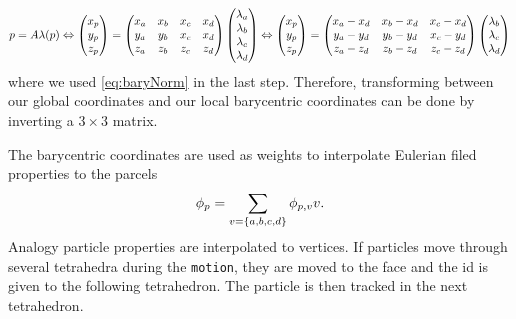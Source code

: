 \begin{equation}
    p = A \lambda (p) \Leftrightarrow \begin{pmatrix}
        x_p \\ y_p \\ z_p
    \end{pmatrix} =
    \begin{pmatrix}
        x_{a} & x_{b} & x_{c} & x_{d} \\
        y_{a} & y_{b} & x_{c} & x_{d} \\
        z_{a} & z_{b} & z_{c} & z_{d}
    \end{pmatrix}
    \begin{pmatrix}
        \lambda_a \\ \lambda_b \\ \lambda_c \\ \lambda_d
    \end{pmatrix}
    \Leftrightarrow
    \begin{pmatrix}
        x_p \\ y_p \\ z_p
    \end{pmatrix} =
    \begin{pmatrix}
        x_{a} - x_{d} & x_{b}- x_{d} & x_{c}- x_{d} \\
        y_{a}- y_{d} & y_{b} - y_{d}& x_{c}- y_{d} \\
        z_{a} - z_{d} & z_{b} - z_{d} & z_{c} - z_{d}
    \end{pmatrix} \begin{pmatrix}
         \lambda_b \\ \lambda_c \\ \lambda_d
    \end{pmatrix}
\end{equation}
where we used \eqref{eq:baryNorm} in the last step.
Therefore, transforming between our global coordinates and our local barycentric coordinates can be done by inverting a $3 \times 3$ matrix.


The barycentric coordinates are used as weights to interpolate Eulerian filed properties to the parcels
\begin{equation}
    \phi_p = \sum_{v=\{a,b, c, d\}} \phi_{p,v} v.
\end{equation}%
Analogy particle properties are interpolated to vertices.
If particles move through several tetrahedra during the \lstinline|motion|, they are moved to the face and the id is given to the following tetrahedron. The particle is then tracked in the next tetrahedron.





